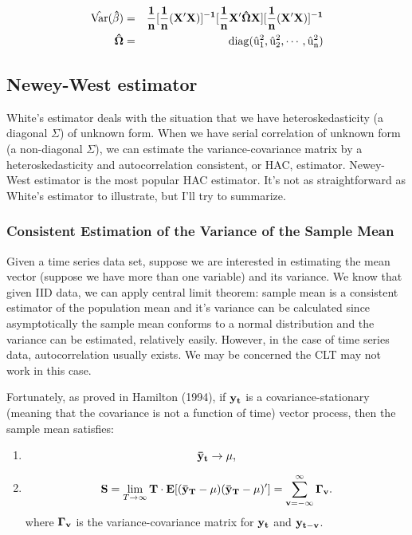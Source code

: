 \begin{eqnarray}
\hat {\rm Var} \bf (\hat \beta) & = & \bf \frac{1}{n}
[\frac{1}{n}(X'X)]^{-1}[\frac{1}{n}X' \hat \Omega
X][\frac{1}{n}(X'X)]^{-1}\\
\bf \hat \Omega & = & \rm{diag}  ({\hat u_1^2, \hat u_2^2, \cdots,
\hat u_n^2})
\end{eqnarray}


\subsection{Newey-West estimator}

White's estimator deals with the situation that we have
heteroskedasticity (a diagonal $\Sigma$) of unknown form.  When we
have serial correlation of unknown form (a non-diagonal $\Sigma$), we
can estimate the variance-covariance matrix by a heteroskedasticity
and autocorrelation consistent, or HAC, estimator.  Newey-West
estimator is the most popular HAC estimator.  It's not as
straightforward as White's estimator to illustrate, but I'll try to
summarize.

\subsubsection{ Consistent Estimation of the Variance of the Sample Mean}

Given a time series data set, suppose we are interested in estimating
the mean vector (suppose we have more than one variable) and its
variance.  We know that given IID data, we can apply central limit
theorem: sample mean is a consistent estimator of the population mean
and it's variance can be calculated since asymptotically the sample
mean conforms to a normal distribution and the variance can be
estimated, relatively easily.  However, in the case of time series
data, autocorrelation usually exists.  We may be concerned the CLT may
not work in this case.

Fortunately, as proved in Hamilton (1994), if $\bf y_t$ is a
covariance-stationary (meaning that the covariance is not a function
of time) vector process, then the sample mean satisfies:
\begin{enumerate}
\item \[\bf \bar y_t \to \mu , \]
\item \[ {\bf S} = \lim_{T \to \infty} \bf  {T \cdot E[(\bar y_T - \mu)(\bar y_T -\mu)' ]} = \sum_{v=-\infty}^{\infty} \Gamma_v . \]
where $\bf \Gamma_v$ is the variance-covariance matrix for $\bf y_t$ and $\bf y_{t-v}$.  
\end{enumerate}

